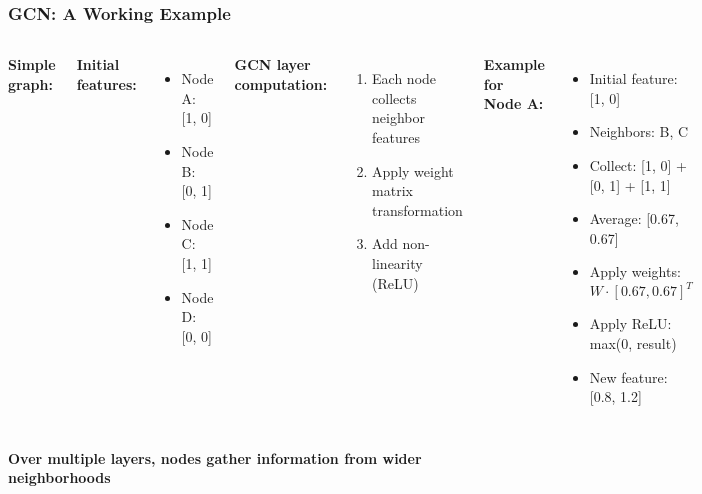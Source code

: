 \documentclass[aspectratio=169]{beamer}
\begin{document}
\begin{frame}
\frametitle{GCN: A Working Example}

\begin{columns}
\textbf{Simple graph:}

\textbf{Initial features:}
\begin{itemize}
    \item Node A: [1, 0]
    \item Node B: [0, 1]
    \item Node C: [1, 1]
    \item Node D: [0, 0]
\end{itemize}

\textbf{GCN layer computation:}
\begin{enumerate}
    \item Each node collects neighbor features
    \item Apply weight matrix transformation
    \item Add non-linearity (ReLU)
\end{enumerate}

\textbf{Example for Node A:}
\begin{itemize}
    \item Initial feature: [1, 0]
    \item Neighbors: B, C
    \item Collect: [1, 0] + [0, 1] + [1, 1]
    \item Average: [0.67, 0.67]
    \item Apply weights: $W \cdot [0.67, 0.67]^T$
    \item Apply ReLU: max(0, result)
    \item New feature: [0.8, 1.2]
\end{itemize}
\end{columns}

\textbf{Over multiple layers, nodes gather information from wider neighborhoods}
\end{frame}
\end{document}
